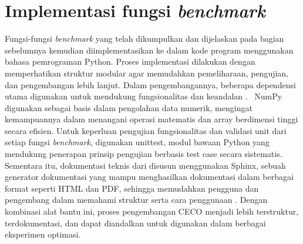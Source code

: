 \section{Implementasi fungsi \textit{benchmark}}
Fungsi-fungsi \textit{benchmark} yang telah dikumpulkan dan dijelaskan pada bagian sebelumnya kemudian diimplementasikan ke dalam kode program menggunakan bahasa pemrograman Python. Proses implementasi dilakukan dengan memperhatikan struktur modular agar memudahkan pemeliharaan, pengujian, dan pengembangan lebih lanjut. Dalam pengembangannya, beberapa dependensi utama digunakan untuk mendukung fungsionalitas dan keandalan .\  NumPy digunakan sebagai basis dalam pengolahan data numerik, mengingat kemampuannya dalam menangani operasi matematis dan array berdimensi tinggi secara efisien. Untuk keperluan pengujian fungsionalitas dan validasi unit dari setiap fungsi \textit{benchmark}, digunakan unittest, modul bawaan Python yang mendukung penerapan prinsip pengujian berbasis test case secara sistematis. Sementara itu, dokumentasi teknis dari  disusun menggunakan Sphinx, sebuah generator dokumentasi yang mampu menghasilkan dokumentasi dalam berbagai format seperti HTML dan PDF, sehingga memudahkan pengguna dan pengembang dalam memahami struktur serta cara penggunaan . Dengan kombinasi alat bantu ini, proses pengembangan  CECO menjadi lebih terstruktur, terdokumentasi, dan dapat diandalkan untuk digunakan dalam berbagai eksperimen optimasi.

